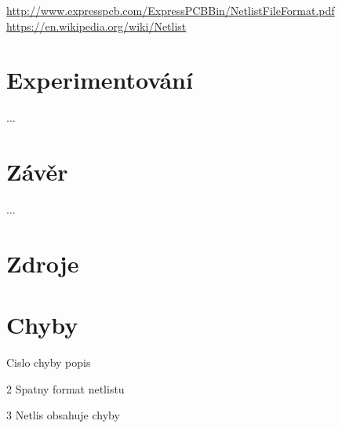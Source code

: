 \documentclass[11pt,a4paper]{article}
\begin{document}
			\url{http://www.expresspcb.com/ExpressPCBBin/NetlistFileFormat.pdf} \\
			\url{https://en.wikipedia.org/wiki/Netlist}
	\section{Experimentování}
		...
		
	\section{Závěr}
		...




	\section{Zdroje}

		

	\section{Chyby}

		Cislo chyby	popis
		
		2		Spatny format netlistu
		
		3		Netlis obsahuje chyby
\end{document}
